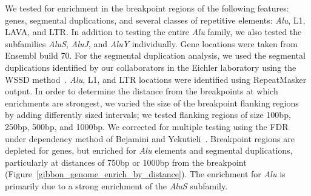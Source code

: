 We tested for enrichment in the breakpoint regions of the following features: genes, segmental duplications, and several classes of repetitive elements: \emph{Alu}, L1, LAVA, and LTR. In addition to testing the entire \emph{Alu} family, we also tested the subfamilies \emph{AluS}, \emph{AluJ}, and \emph{AluY} individually. Gene locations were taken from Ensembl build 70. For the segmental duplication analysis, we used the segmental duplications identified by our collaborators in the Eichler laboratory using the WSSD method~\cite{Bailey:2002jp}. \emph{Alu}, L1, and LTR locations were identified using RepeatMasker output. In order to determine the distance from the breakpoints at which enrichments are strongest, we varied the size of the breakpoint flanking regions by adding differently sized intervals; we tested flanking regions of size 100bp, 250bp, 500bp, and 1000bp. We corrected for multiple testing using the FDR under dependency method of Bejamini and Yekutieli~\cite{Benjamini:2001fs}. Breakpoint regions are depleted for genes, but enriched for \emph{Alu} elements and segmental duplications, particularly at distances of 750bp or 1000bp from the breakpoint (Figure~\ref{gibbon_genome_enrich_by_distance}). The enrichment for \emph{Alu} is primarily due to a strong enrichment of the \emph{AluS} subfamily.

